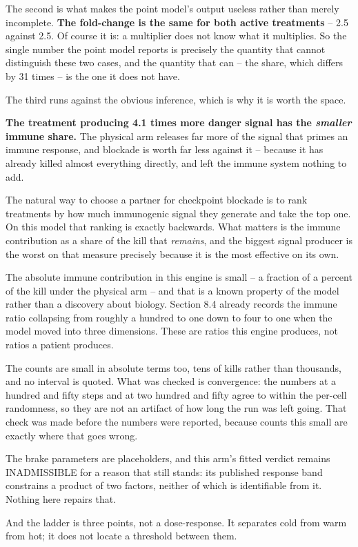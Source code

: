 \documentclass[11pt,twoside,openright]{report}
\begin{document}
The second is what makes the point model's output useless rather than merely incomplete. \textbf{The fold-change is the same for both active treatments} -- 2.5 against 2.5. Of course it is: a multiplier does not know what it multiplies. So the single number the point model reports is precisely the quantity that cannot distinguish these two cases, and the quantity that can -- the share, which differs by 31 times -- is the one it does not have.

\begin{finding}
The third runs against the obvious inference, which is why it is worth the space.

\textbf{The treatment producing 4.1 times more danger signal has the \textit{smaller} immune share.} The physical arm releases far more of the signal that primes an immune response, and blockade is worth far less against it -- because it has already killed almost everything directly, and left the immune system nothing to add.

The natural way to choose a partner for checkpoint blockade is to rank treatments by how much immunogenic signal they generate and take the top one. On this model that ranking is exactly backwards. What matters is the immune contribution as a share of the kill that \textit{remains}, and the biggest signal producer is the worst on that measure precisely because it is the most effective on its own.
\end{finding}

\begin{refusal}
The absolute immune contribution in this engine is small -- a fraction of a percent of the kill under the physical arm -- and that is a known property of the model rather than a discovery about biology. Section 8.4 already records the immune ratio collapsing from roughly a hundred to one down to four to one when the model moved into three dimensions. These are ratios this engine produces, not ratios a patient produces.

The counts are small in absolute terms too, tens of kills rather than thousands, and no interval is quoted. What was checked is convergence: the numbers at a hundred and fifty steps and at two hundred and fifty agree to within the per-cell randomness, so they are not an artifact of how long the run was left going. That check was made before the numbers were reported, because counts this small are exactly where that goes wrong.

The brake parameters are placeholders, and this arm's fitted verdict remains INADMISSIBLE for a reason that still stands: its published response band constrains a product of two factors, neither of which is identifiable from it. Nothing here repairs that.

And the ladder is three points, not a dose-response. It separates cold from warm from hot; it does not locate a threshold between them.
\end{refusal}
\end{document}
